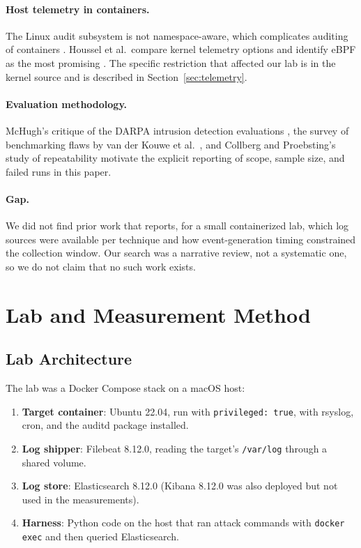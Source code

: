 \documentclass[11pt,a4paper]{article}
\begin{document}
\paragraph{Host telemetry in containers.}
The Linux audit subsystem is not namespace-aware, which complicates auditing
of containers \cite{lim2021,chen2021}. Houssel et al.\ compare kernel telemetry
options and identify eBPF as the most promising \cite{houssel2026}. The
specific restriction that affected our lab is in the kernel source
\cite{linux-audit} and is described in Section~\ref{sec:telemetry}.

\paragraph{Evaluation methodology.}
McHugh's critique of the DARPA intrusion detection evaluations
\cite{mchugh2000}, the survey of benchmarking flaws by van der Kouwe et al.\
\cite{vanderkouwe2019}, and Collberg and Proebsting's study of repeatability
\cite{collberg2016} motivate the explicit reporting of scope, sample size, and
failed runs in this paper.

\paragraph{Gap.}
We did not find prior work that reports, for a small containerized lab, which
log sources were available per technique and how event-generation timing
constrained the collection window. Our search was a narrative review, not a
systematic one, so we do not claim that no such work exists.

\section{Lab and Measurement Method}

\subsection{Lab Architecture}

The lab was a Docker Compose stack on a macOS host:

\begin{enumerate}
    \item \textbf{Target container}: Ubuntu 22.04, run with
    \texttt{privileged: true}, with rsyslog, cron, and the auditd package
    installed.
    \item \textbf{Log shipper}: Filebeat 8.12.0, reading the target's
    \texttt{/var/log} through a shared volume.
    \item \textbf{Log store}: Elasticsearch 8.12.0 (Kibana 8.12.0 was also
    deployed but not used in the measurements).
    \item \textbf{Harness}: Python code on the host that ran attack commands
    with \texttt{docker exec} and then queried Elasticsearch.
\end{enumerate}
\end{document}
